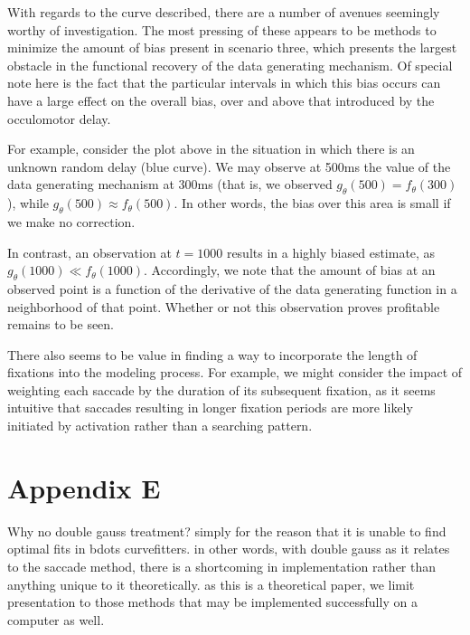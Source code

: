 \documentclass{article}
\begin{document}
With regards to the curve described, there are a number of avenues seemingly worthy of investigation. The most pressing of these appears to be methods to minimize the amount of bias present in scenario three, which presents the largest obstacle in the functional recovery of the data generating mechanism. Of special note here is the fact that the particular intervals in which this bias occurs can have a large effect on the overall bias, over and above that introduced by the occulomotor delay. 

For example, consider the plot above in the situation in which there is an unknown random delay (blue curve). We may observe at 500ms the value of the data generating mechanism at 300ms (that is, we observed $g_{\theta}(500) = f_{\theta}(300)$), while $g_{\theta}(500) \approx f_{\theta}(500)$. In other words, the bias over this area is small if we make no correction.

In contrast, an observation at $t = 1000$ results in a highly biased estimate, as $g_{\theta}(1000) \ll f_{\theta}(1000)$. Accordingly, we note that the amount of bias at an observed point is a function of the derivative of the data generating function in a neighborhood of that point. Whether or not this observation proves profitable remains to be seen.

There also seems to be value in finding a way to incorporate the length of fixations into the modeling process. For example, we might consider the impact of weighting each saccade by the duration of its subsequent fixation, as it seems intuitive that saccades resulting in longer fixation periods are more likely initiated by activation rather than a searching pattern.

\section*{Appendix E}

Why no double gauss treatment? simply for the reason that it is unable to find optimal fits in bdots curvefitters. in other words, with double gauss as it relates to the saccade method, there is a shortcoming in implementation rather than anything unique to it theoretically. as this is a theoretical paper, we limit presentation to those methods that may be implemented successfully on a computer as well.
\end{document}
